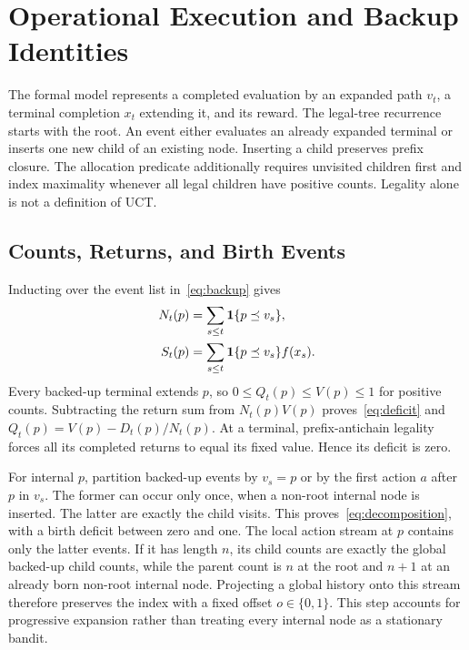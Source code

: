 \ifdefined\AgentUCTProofOnly
\else
\appendix

\fi
\section{Operational Execution and Backup Identities}
\label{app:operational}
The formal model represents a completed evaluation by an expanded path $v_t$, a terminal completion $x_t$ extending it, and its reward. The legal-tree recurrence starts with the root. An event either evaluates an already expanded terminal or inserts one new child of an existing node. Inserting a child preserves prefix closure. The allocation predicate additionally requires unvisited children first and index maximality whenever all legal children have positive counts. Legality alone is not a definition of UCT.

\subsection{Counts, Returns, and Birth Events}
Inducting over the event list in~\eqref{eq:backup} gives
\begin{align}
 N_t(p)&=\sum_{s\le t}\mathbf{1}\{p\preceq v_s\},\\
 S_t(p)&=\sum_{s\le t}\mathbf{1}\{p\preceq v_s\}f(x_s).
\end{align}
Every backed-up terminal extends $p$, so $0\le Q_t(p)\le V(p)\le1$ for positive counts. Subtracting the return sum from $N_t(p)V(p)$ proves~\eqref{eq:deficit} and $Q_t(p)=V(p)-D_t(p)/N_t(p)$. At a terminal, prefix-antichain legality forces all its completed returns to equal its fixed value. Hence its deficit is zero.

For internal $p$, partition backed-up events by $v_s=p$ or by the first action $a$ after $p$ in $v_s$. The former can occur only once, when a non-root internal node is inserted. The latter are exactly the child visits. This proves~\eqref{eq:decomposition}, with a birth deficit between zero and one. The local action stream at $p$ contains only the latter events. If it has length $n$, its child counts are exactly the global backed-up child counts, while the parent count is $n$ at the root and $n+1$ at an already born non-root internal node. Projecting a global history onto this stream therefore preserves the index with a fixed offset $o\in\{0,1\}$. This step accounts for progressive expansion rather than treating every internal node as a stationary bandit.

